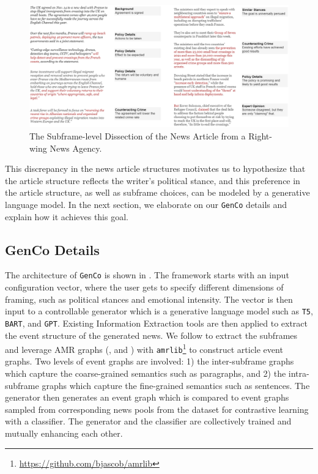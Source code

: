 \begin{figure}[ht!]
    \centering
    \includegraphics[width=\textwidth]{img/genco-motivation-right}
    \caption{The Subframe-level Dissection of the News Article from a Right-wing News Agency.}
    \label{fig:genco-motivation-right}
\end{figure}

This discrepancy in the news article structures motivates us to hypothesize that the article structure reflects the writer's political stance, and this preference in the article structure, as well as subframe choices, can be modeled by a generative language model. In the next section, we elaborate on our \texttt{GenCo} details and explain how it achieves this goal.

\subsection{GenCo Details}
\label{genco-details}
The architecture of \texttt{GenCo} is shown in . The framework starts with an input configuration vector, where the user gets to specify different dimensions of framing, such as political stances and emotional intensity. The vector is then input to a controllable generator which is a generative language model such as \texttt{T5}, \texttt{BART}, and \texttt{GPT}. Existing Information Extraction tools are then applied to extract the event structure of the generated news. We follow \cite{roy-goldwasser-2020-weakly} to extract the subframes and leverage AMR graphs (\eg,  and ) with \texttt{amrlib}\footnote{\url{https://github.com/bjascob/amrlib}} to construct article event graphs. Two levels of event graphs are involved: 1) the inter-subframe graphs which capture the coarse-grained semantics such as paragraphs, and 2) the intra-subframe graphs which capture the fine-grained semantics such as sentences. The generator then generates an event graph which is compared to event graphs sampled from corresponding news pools from the dataset for contrastive learning with a classifier. The generator and the classifier are collectively trained and mutually enhancing each other.

